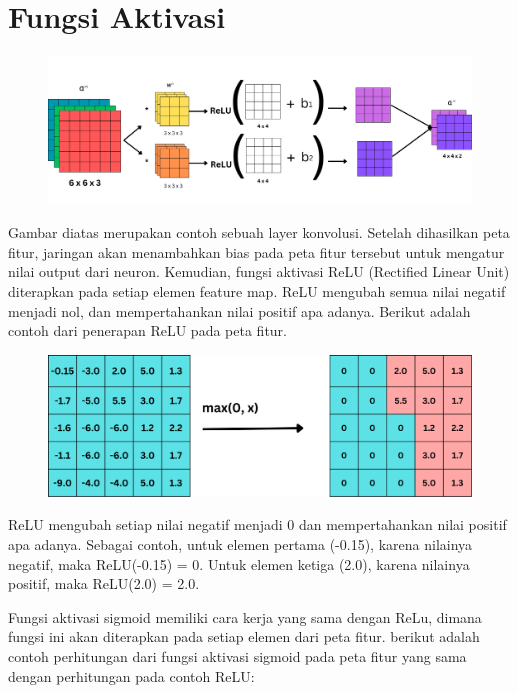 
\section{Fungsi Aktivasi}

\begin{figure}[H]
	\centering
	\includegraphics[scale=.2]{gambar/lampiran/feed-fwrd.png}
\end{figure}

\noindent Gambar diatas merupakan contoh sebuah layer konvolusi. Setelah dihasilkan peta fitur, jaringan akan menambahkan bias pada peta fitur tersebut untuk mengatur nilai output dari neuron. Kemudian, fungsi aktivasi ReLU (Rectified Linear Unit) diterapkan pada setiap elemen feature map. ReLU mengubah semua nilai negatif menjadi nol, dan mempertahankan nilai positif apa adanya. Berikut adalah contoh dari penerapan ReLU pada peta fitur.

\begin{figure}[H]
	\centering
	\includegraphics[scale=.2]{gambar/lampiran/fungsi-relu.png}
\end{figure}

ReLU mengubah setiap nilai negatif menjadi 0 dan mempertahankan nilai positif apa adanya. Sebagai contoh, untuk elemen pertama (-0.15), karena nilainya negatif, maka ReLU(-0.15) = 0.  Untuk elemen ketiga (2.0), karena nilainya positif, maka ReLU(2.0) = 2.0.

\noindent Fungsi aktivasi sigmoid memiliki cara kerja yang sama dengan ReLu, dimana fungsi ini akan diterapkan pada setiap elemen dari peta fitur. berikut adalah contoh perhitungan dari fungsi aktivasi sigmoid pada peta fitur yang sama dengan perhitungan pada contoh ReLU:

